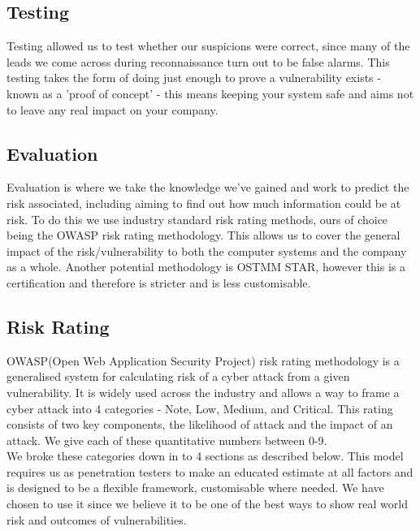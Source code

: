 \documentclass{report}
\begin{document}
\subsection{Testing}
Testing allowed us to test whether our suspicions were correct, since many of the leads we come across during reconnaissance turn out to be false alarms. This testing takes the form of doing just enough to prove a vulnerability exists - known as a 'proof of concept' - this means keeping your system safe and aims not to leave any real impact on your company.
\subsection{Evaluation}
Evaluation is where we take the knowledge we've gained and work to predict the risk associated, including aiming to find out how much information could be at risk. To do this we use industry standard risk rating methods, ours of choice being the OWASP risk rating methodology. This allows us to cover the general impact of the risk/vulnerability to both the computer systems and the company as a whole. Another potential methodology is OSTMM STAR, however this is a certification and therefore is stricter and is less customisable.
\subsection{Risk Rating}
OWASP(Open Web Application Security Project) risk rating methodology is a generalised system for calculating risk of a cyber attack from a given vulnerability. It is widely used across the industry and allows a way to frame a cyber attack into 4 categories -  Note, Low, Medium, and Critical. This rating consists of two key components, the likelihood of attack and the impact of an attack. We give each of these quantitative numbers between 0-9.\\
 We broke these categories down in to 4 sections as described below. This model requires us as penetration testers to make an educated estimate at all factors and is designed to be a flexible framework, customisable where needed. We have chosen to use it since we believe it to be one of the best ways to show real world risk and outcomes of vulnerabilities.
\end{document}
